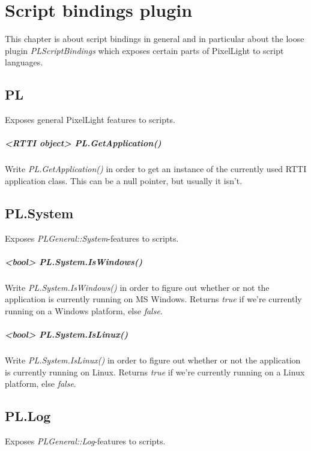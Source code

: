 \chapter{Script bindings plugin}
This chapter is about script bindings in general and in particular about the loose plugin \emph{PLScriptBindings} which exposes certain parts of PixelLight to script languages.




\section{PL}
Exposes general PixelLight features to scripts.


\paragraph{<RTTI object> PL.GetApplication()}
Write \emph{PL.GetApplication()} in order to get an instance of the currently used RTTI application class. This can be a null pointer, but usually it isn't.




\section{PL.System}
Exposes \emph{PLGeneral::System}-features to scripts.


\paragraph{<bool> PL.System.IsWindows()}
Write \emph{PL.System.IsWindows()} in order to figure out whether or not the application is currently running on MS Windows. Returns \emph{true} if we're currently running on a Windows platform, else \emph{false}.


\paragraph{<bool> PL.System.IsLinux()}
Write \emph{PL.System.IsLinux()} in order to figure out whether or not the application is currently running on Linux. Returns \emph{true} if we're currently running on a Linux platform, else \emph{false}.




\section{PL.Log}
Exposes \emph{PLGeneral::Log}-features to scripts.


